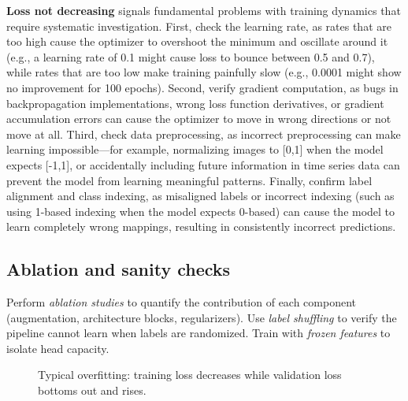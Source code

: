 \textbf{Loss not decreasing} signals fundamental problems with training dynamics that require systematic investigation. First, check the learning rate, as rates that are too high cause the optimizer to overshoot the minimum and oscillate around it (e.g., a learning rate of 0.1 might cause loss to bounce between 0.5 and 0.7), while rates that are too low make training painfully slow (e.g., 0.0001 might show no improvement for 100 epochs). Second, verify gradient computation, as bugs in backpropagation implementations, wrong loss function derivatives, or gradient accumulation errors can cause the optimizer to move in wrong directions or not move at all. Third, check data preprocessing, as incorrect preprocessing can make learning impossible—for example, normalizing images to [0,1] when the model expects [-1,1], or accidentally including future information in time series data can prevent the model from learning meaningful patterns. Finally, confirm label alignment and class indexing, as misaligned labels or incorrect indexing (such as using 1-based indexing when the model expects 0-based) can cause the model to learn completely wrong mappings, resulting in consistently incorrect predictions.

\subsection{Ablation and sanity checks}

Perform \emph{ablation studies}  to quantify the contribution of each component (augmentation, architecture blocks, regularizers). Use \emph{label shuffling} to verify the pipeline cannot learn when labels are randomized. Train with \emph{frozen features} to isolate head capacity.


\begin{figure}[h]
  \centering
  \caption{Typical overfitting: training loss decreases while validation loss bottoms out and rises.}
  \label{fig:overfit-curve}
\end{figure}


